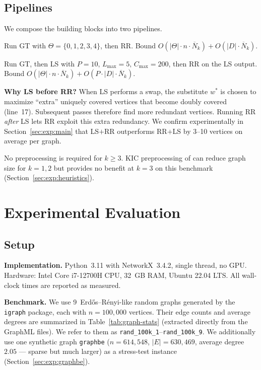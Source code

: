 \documentclass[11pt,a4paper]{article}
\newcommand{\Nk}{\overline{N}_k}
\begin{document}
\subsection{Pipelines}
\label{sec:pipelines}

We compose the building blocks into two pipelines.

\begin{description}[nosep,labelwidth=2.6cm,leftmargin=2.8cm]
  \item[GT$+$RR (2 phases):]
    Run GT with $\Theta=\{0,1,2,3,4\}$, then RR.
    Bound $O(|\Theta|\cdot n\cdot\Nk)+O(|D|\cdot\Nk)$.
  \item[GT$+$LS$+$RR (3 phases):]
    Run GT, then LS with $P=10,\,L_{\max}=5,\,C_{\max}=200$, then RR
    on the LS output.
    Bound $O(|\Theta|\cdot n\cdot\Nk)+O(P\cdot|D|\cdot\Nk)$.
\end{description}

\textbf{Why LS before RR?}
When LS performs a swap, the substitute $w^*$ is chosen to maximize
``extra'' uniquely covered vertices that become doubly covered
(line~17). Subsequent passes therefore find more redundant vertices.
Running RR \emph{after} LS lets RR exploit this extra redundancy. We
confirm experimentally in Section~\ref{sec:exp:main} that LS$+$RR
outperforms RR$+$LS by 3--10 vertices on average per graph.

No preprocessing is required for $k\ge 3$. KIC preprocessing of
\cite{nguyen2020} can reduce graph size for $k=1,2$ but provides no
benefit at $k=3$ on this benchmark
(Section~\ref{sec:exp:heuristics}).


\section{Experimental Evaluation}
\label{sec:experiments}

\subsection{Setup}
\label{sec:exp:setup}

\textbf{Implementation.} Python~3.11 with NetworkX~3.4.2, single thread,
no GPU. Hardware: Intel Core i7-12700H CPU, 32~GB RAM, Ubuntu 22.04
LTS. All wall-clock times are reported as measured.

\textbf{Benchmark.} We use 9~Erd\H{o}s--R\'enyi-like random graphs
generated by the \texttt{igraph} package, each with $n=100{,}000$
vertices.
Their edge counts and average degrees are summarized in
Table~\ref{tab:graph-stats} (extracted directly from the GraphML files).
We refer to them as \texttt{rand\_100k\_1}--\texttt{rand\_100k\_9}.
We additionally use one synthetic graph
\texttt{graphbe} ($n=614{,}548$, $|E|=630{,}469$,
average degree~$2.05$ — sparse but much larger) as a stress-test instance
(Section~\ref{sec:exp:graphbe}).
\end{document}
